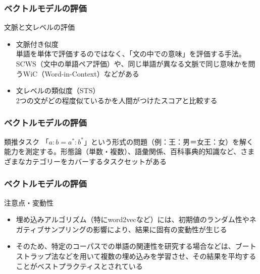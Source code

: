 \documentclass[unicode,11pt]{beamer} %
\begin{document}
\begin{frame}
    \frametitle{ベクトルモデルの評価}
    \begin{alertblock}{文脈と文レベルの評価}
        \begin{itemize}
            \item 文脈付き似度\\単語を単体で評価するのではなく、「文の中での意味」を評価する手法。SCWS（文中の単語ペア評価）や、同じ単語が異なる文脈で同じ意味かを問うWiC（Word-in-Context）などがある
            \item 文レベルの類似度（STS）\\2つの文がどの程度似ているかを人間がつけたスコアと比較する
        \end{itemize}
    \end{alertblock}
\end{frame}

\begin{frame}
    \frametitle{ベクトルモデルの評価}
    \begin{alertblock}{類推タスク}
        「$a : b =  a^* : b^*$」という形式の問題（例：王：男＝女王：女）を解く能力を測定する。形態論（単数・複数）、語彙関係、百科事典的知識など、さまざまなカテゴリーをカバーするタスクセットがある
    \end{alertblock}
\end{frame}

\begin{frame}
    \frametitle{ベクトルモデルの評価}
    \begin{alertblock}{注意点・変動性}
        \begin{itemize}
            \item 埋め込みアルゴリズム（特にword2vecなど）には、初期値のランダム性やネガティブサンプリングの影響により、結果に固有の変動性が生じる
            \item そのため、特定のコーパスでの単語の関連性を研究する場合などは、ブートストラップ法などを用いて複数の埋め込みを学習させ、その結果を平均することがベストプラクティスとされている
        \end{itemize}
    \end{alertblock}
\end{frame}
\end{document}
